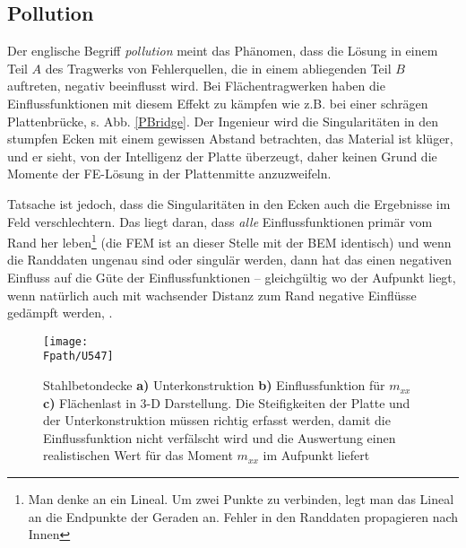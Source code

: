 {\textcolor{sectionTitleBlue}{\section{Pollution}}}
Der englische Begriff {\em pollution\/} meint das Ph\"{a}nomen, dass die L\"{o}sung in einem Teil $A$ des Tragwerks von Fehlerquellen, die in einem abliegenden Teil $B$ auftreten, negativ beeinflusst wird. Bei Fl\"{a}chentragwerken haben die Einflussfunktionen mit diesem Effekt zu k\"{a}mpfen wie z.B. bei einer schr\"{a}gen Plattenbr\"{u}cke, s. Abb. \ref{PBridge}. Der Ingenieur wird die Singularit\"{a}ten in den stumpfen Ecken mit einem gewissen Abstand betrachten, \glq das Material ist kl\"{u}ger\grq, und er sieht, von der \glq Intelligenz\grq{} der Platte \"{u}berzeugt, daher keinen Grund die Momente der FE-L\"{o}sung in der Plattenmitte anzuzweifeln.

Tatsache ist jedoch, dass die Singularit\"{a}ten in den Ecken auch die Ergebnisse im Feld verschlechtern. Das liegt daran, dass {\em alle\/} Einflussfunktionen prim\"{a}r vom Rand her leben\footnote{Man denke an ein Lineal. Um zwei Punkte zu verbinden, legt man das Lineal an die Endpunkte der Geraden an. Fehler in den Randdaten propagieren nach Innen} (die FEM ist an dieser Stelle mit der BEM identisch) und wenn die Randdaten ungenau sind oder singul\"{a}r werden, dann hat das einen negativen Einfluss auf die G\"{u}te der Einflussfunktionen -- gleichg\"{u}ltig wo der Aufpunkt liegt, wenn nat\"{u}rlich auch mit wachsender Distanz zum Rand negative Einfl\"{u}sse ged\"{a}mpft werden, \cite{HaJa2}.

\begin{figure}
\centering
\if {} \sidecaption \fi
\texttt{[image: \\Fpath/U547]}
\caption{Stahlbetondecke \textbf{ a)} Unterkonstruktion \textbf{ b)} Einflussfunktion f\"{u}r $m_{xx}$ \textbf{ c)} Fl\"{a}chenlast in 3-D Darstellung. Die Steifigkeiten der Platte und der Unterkonstruktion m\"{u}ssen richtig erfasst werden, damit die  Einflussfunktion nicht verf\"{a}lscht wird und die Auswertung einen realistischen Wert f\"{u}r das Moment $m_{xx}$ im Aufpunkt liefert}
\label{U547}%
\end{figure}%

